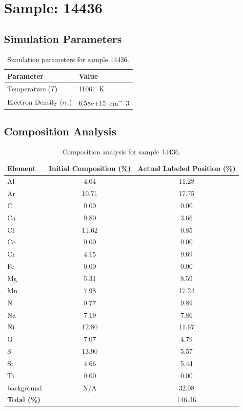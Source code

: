 \documentclass[a4paper,11pt]{article}
\begin{document}
\clearpage

\section{Sample: 14436}
\subsection{Simulation Parameters}
\begin{table}[h!]
    \centering
    \begin{tabular}{ll}
        \toprule
        \textbf{Parameter} & \textbf{Value} \\
        \midrule
        Temperature ($T$) & 11061 \,\si{K} \\
        Electron Density ($n_e$) & 6.58e+15 \,\si{cm^-3} \\
        \bottomrule
    \end{tabular}
    \caption{Simulation parameters for sample 14436.}
    \label{tab:params_14436}
\end{table}

\subsection{Composition Analysis}
\begin{table}[h!]
    \centering
    \begin{tabular}{lcc}
        \toprule
        \textbf{Element} & \textbf{Initial Composition (\%)} & \textbf{Actual Labeled Position (\%)} \\
        \midrule
        Al & 4.04 & 11.28 \\
        Ar & 10.71 & 17.75 \\
        C & 0.00 & 0.00 \\
        Ca & 9.80 & 3.66 \\
        Cl & 11.62 & 0.85 \\
        Co & 0.00 & 0.00 \\
        Cr & 4.15 & 9.69 \\
        Fe & 0.00 & 0.00 \\
        Mg & 5.31 & 8.59 \\
        Mn & 7.98 & 17.24 \\
        N & 0.77 & 9.89 \\
        Na & 7.19 & 7.86 \\
        Ni & 12.80 & 11.67 \\
        O & 7.07 & 4.79 \\
        S & 13.90 & 5.57 \\
        Si & 4.66 & 5.44 \\
        Ti & 0.00 & 0.00 \\
        background & N/A & 32.08 \\

        \midrule
        \textbf{Total (\%)} & & 146.36 \\
        \bottomrule
    \end{tabular}
    \caption{Composition analysis for sample 14436.}
    \label{tab:comp_14436}
\end{table}
\end{document}
